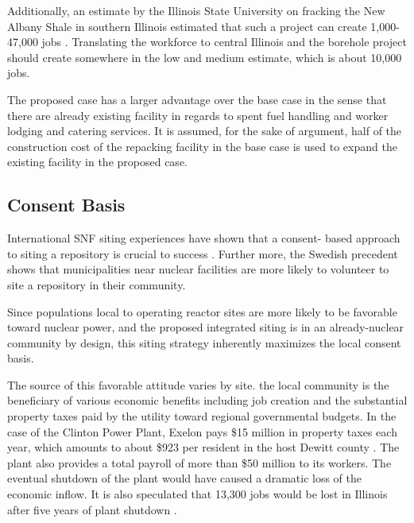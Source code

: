 Additionally, an estimate by the Illinois State University on fracking the New Albany
Shale in southern Illinois estimated that such a project can create 1,000-47,000 jobs
\cite{loomis_potential_2012}. Translating the workforce to central Illinois and the borehole
project should create somewhere in the low and medium estimate, which is about 10,000
jobs.   

%

The proposed case has a larger advantage over the base case in the sense that there
are already existing facility in regards to spent fuel handling and worker lodging 
and catering services. 
It is assumed, for the sake of argument, half of the construction cost of the
repacking facility in the base case is used to expand the existing facility in the
proposed case. 


\subsection{Consent Basis}
International \gls{SNF} siting experiences have shown that a consent-
based approach to siting a repository is crucial to success
\cite{ayers_blue_2012,doe_designing_2016,jenkins-smith_public_2013,freeze_siting_2015}. 
Further more, the Swedish precedent \cite{olsson_experiences_2013} shows that 
municipalities near nuclear facilities
are more likely to volunteer to site a repository in their community.

Since populations local to operating reactor sites are more likely to be 
favorable toward nuclear power, and the proposed integrated siting 
is in an already-nuclear community by design, this siting strategy inherently 
maximizes the local consent basis.

The source of this favorable attitude varies by site. 
the local community is the beneficiary of various economic benefits
including job creation and the substantial property taxes paid by the utility 
toward regional governmental budgets.   In the case of the Clinton Power Plant, 
Exelon pays \$15 million in property taxes each year, which amounts to about 
\$923 per resident in the host Dewitt county \cite{brady-lunny_dewitt_2016}. The plant
also provides a total payroll of more than \$50 million to its workers.
The eventual shutdown of the plant would have caused a dramatic loss of the economic inflow.
It is also speculated that 13,300 jobs would be lost in Illinois after five years 
of plant shutdown \cite{reid_study:_2014}.  

